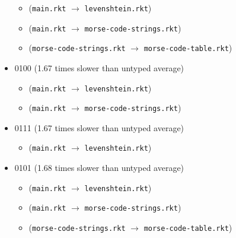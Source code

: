 \documentclass{article}
\newcommand{\mono}[1]{\texttt{#1}}
\begin{document}
\begin{itemize}
  \begin{itemize}
  \item (\mono{main.rkt} $\rightarrow$ \mono{levenshtein.rkt})
  \item (\mono{main.rkt} $\rightarrow$ \mono{morse-code-strings.rkt})
  \item (\mono{morse-code-strings.rkt} $\rightarrow$ \mono{morse-code-table.rkt})
  \end{itemize}
\item 0100 (1.67 times slower than untyped average)
  \begin{itemize}
  \item (\mono{main.rkt} $\rightarrow$ \mono{levenshtein.rkt})
  \item (\mono{main.rkt} $\rightarrow$ \mono{morse-code-strings.rkt})
  \end{itemize}
\item 0111 (1.67 times slower than untyped average)
  \begin{itemize}
  \item (\mono{main.rkt} $\rightarrow$ \mono{levenshtein.rkt})
  \end{itemize}
\item 0101 (1.68 times slower than untyped average)
  \begin{itemize}
  \item (\mono{main.rkt} $\rightarrow$ \mono{levenshtein.rkt})
  \item (\mono{main.rkt} $\rightarrow$ \mono{morse-code-strings.rkt})
  \item (\mono{morse-code-strings.rkt} $\rightarrow$ \mono{morse-code-table.rkt})
  \end{itemize}


\end{itemize}
\end{document}
